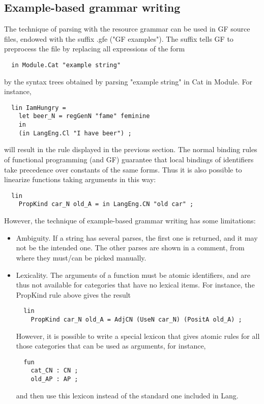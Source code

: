 \documentclass[11pt,a4paper]{article}
\begin{document}
\subsection{Example-based grammar writing}
The technique of parsing with the resource grammar can be used in GF source files,
endowed with the suffix .gfe ("GF examples"). The suffix tells GF to preprocess
the file by replacing all expressions of the form

\begin{verbatim}
  in Module.Cat "example string"
\end{verbatim}
by the syntax trees obtained by parsing "example string" in Cat in Module.
For instance,

\begin{verbatim}
  lin IamHungry = 
    let beer_N = regGenN "fame" feminine 
    in
    (in LangEng.Cl "I have beer") ;
\end{verbatim}
will result in the rule displayed in the previous section. The normal binding rules
of functional programming (and GF) guarantee that local bindings of identifiers
take precedence over constants of the same forms. Thus it is also possible to
linearize functions taking arguments in this way:

\begin{verbatim}
  lin
    PropKind car_N old_A = in LangEng.CN "old car" ;
\end{verbatim}
However, the technique of example-based grammar writing has some limitations:

\begin{itemize}
\item Ambiguity. If a string has several parses, the first one is returned, and
it may not be the intended one. The other parses are shown in a comment, from
where they must/can be picked manually.
\item Lexicality. The arguments of a function must be atomic identifiers, and are thus
not available for categories that have no lexical items. For instance, the PropKind
rule above gives the result
\begin{verbatim}
  lin
    PropKind car_N old_A = AdjCN (UseN car_N) (PositA old_A) ;  
\end{verbatim}
However, it is possible to write a special lexicon that gives atomic rules for
all those categories that can be used as arguments, for instance,
\begin{verbatim}
  fun
    cat_CN : CN ;
    old_AP : AP ;
\end{verbatim}
and then use this lexicon instead of the standard one included in Lang.
\end{itemize}
\end{document}

